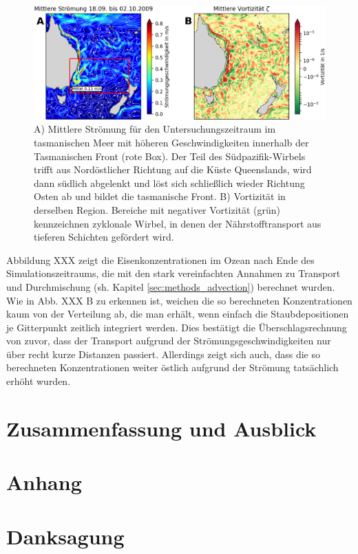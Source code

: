 \documentclass[12pt,a4paper,onecolumn,draft]{scrartcl}
\begin{document}
\begin{figure}
\includegraphics[width=\textwidth]{bilder/currents_mean.png}
\caption{A) Mittlere Strömung für den Untersuchungszeitraum im tasmanischen Meer mit höheren Geschwindigkeiten innerhalb der Tasmanischen Front (rote Box). Der Teil des Südpazifik-Wirbels trifft aus Nordöstlicher Richtung auf die Küste Queenslands, wird dann südlich abgelenkt und löst sich schließlich wieder Richtung Osten ab und bildet die tasmanische Front. B) Vortizität in derselben Region. Bereiche mit negativer Vortizität (grün) kennzeichnen zyklonale Wirbel, in denen der Nährstofftransport aus tieferen Schichten gefördert wird. } \label{fig:tasman_current}
\end{figure}
Abbildung XXX zeigt die Eisenkonzentrationen im Ozean nach Ende des Simulationszeitraums, die mit den stark vereinfachten Annahmen zu Transport und Durchmischung (sh. Kapitel \ref{sec:methods_advection}) berechnet wurden. Wie in Abb. XXX B zu erkennen ist, weichen die so berechneten Konzentrationen kaum von der Verteilung ab, die man erhält, wenn einfach die Staubdepositionen je Gitterpunkt zeitlich integriert werden. Dies bestätigt die Überschlagsrechnung von zuvor, dass der Transport aufgrund der Strömungsgeschwindigkeiten nur über recht kurze Distanzen passiert. Allerdings zeigt sich auch, dass die so berechneten Konzentrationen weiter östlich aufgrund der Strömung tatsächlich erhöht wurden.    

\section{Zusammenfassung und Ausblick}
\newpage
\printbibliography
\appendix
\section{Anhang}

\section{Danksagung}
\nocite{*}
\end{document}
